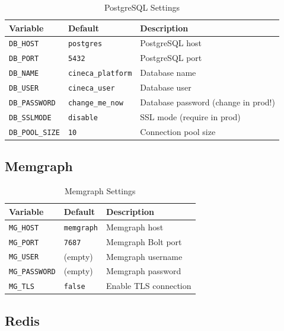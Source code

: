 \documentclass[a4paper,twoside]{sapthesis}
\begin{document}
\begin{table}[ht]
\centering
\caption{PostgreSQL Settings}
\label{tab:config-postgres}
\small
\begin{tabularx}{\textwidth}{llX}
    \hline
    \textbf{Variable} & \textbf{Default} & \textbf{Description} \\
    \hline
    \texttt{DB\_HOST} & \texttt{postgres} & PostgreSQL host \\
    \texttt{DB\_PORT} & \texttt{5432} & PostgreSQL port \\
    \texttt{DB\_NAME} & \texttt{cineca\_platform} & Database name \\
    \texttt{DB\_USER} & \texttt{cineca\_user} & Database user \\
    \texttt{DB\_PASSWORD} & \texttt{change\_me\_now} & Database password (change in prod!) \\
    \texttt{DB\_SSLMODE} & \texttt{disable} & SSL mode (require in prod) \\
    \texttt{DB\_POOL\_SIZE} & \texttt{10} & Connection pool size \\
    \hline
\end{tabularx}
\end{table}

\subsection{Memgraph}

\begin{table}[ht]
\centering
\caption{Memgraph Settings}
\label{tab:config-memgraph}
\small
\begin{tabularx}{\textwidth}{llX}
    \hline
    \textbf{Variable} & \textbf{Default} & \textbf{Description} \\
    \hline
    \texttt{MG\_HOST} & \texttt{memgraph} & Memgraph host \\
    \texttt{MG\_PORT} & \texttt{7687} & Memgraph Bolt port \\
    \texttt{MG\_USER} & (empty) & Memgraph username \\
    \texttt{MG\_PASSWORD} & (empty) & Memgraph password \\
    \texttt{MG\_TLS} & \texttt{false} & Enable TLS connection \\
    \hline
\end{tabularx}
\end{table}

\subsection{Redis}
\end{document}
